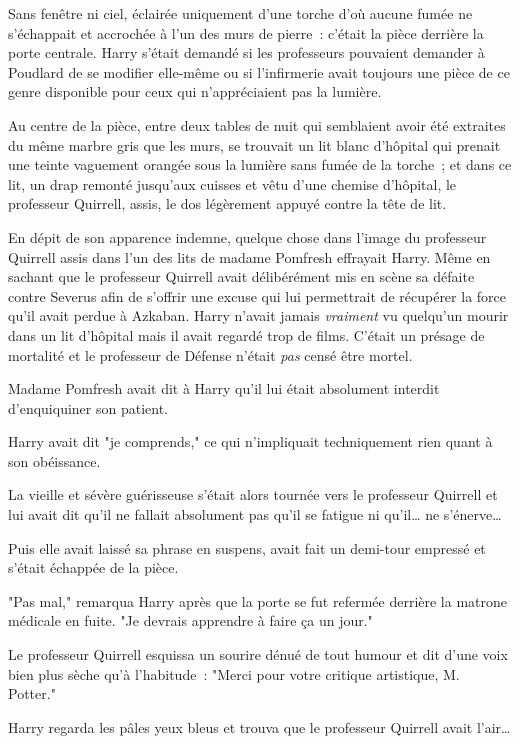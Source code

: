 Sans fenêtre ni ciel, éclairée uniquement d'une torche d'où aucune fumée ne s'échappait et accrochée à l'un des murs de pierre~: c'était la pièce derrière la porte centrale. Harry s'était demandé si les professeurs pouvaient demander à Poudlard de se modifier elle-même ou si l'infirmerie avait toujours une pièce de ce genre disponible pour ceux qui n'appréciaient pas la lumière.

Au centre de la pièce, entre deux tables de nuit qui semblaient avoir été extraites du même marbre gris que les murs, se trouvait un lit blanc d'hôpital qui prenait une teinte vaguement orangée sous la lumière sans fumée de la torche~; et dans ce lit, un drap remonté jusqu'aux cuisses et vêtu d'une chemise d'hôpital, le professeur Quirrell, assis, le dos légèrement appuyé contre la tête de lit.

En dépit de son apparence indemne, quelque chose dans l'image du professeur Quirrell assis dans l'un des lits de madame Pomfresh effrayait Harry. Même en sachant que le professeur Quirrell avait délibérément mis en scène sa défaite contre Severus afin de s'offrir une excuse qui lui permettrait de récupérer la force qu'il avait perdue à Azkaban. Harry n'avait jamais \emph{vraiment} vu quelqu'un mourir dans un lit d'hôpital mais il avait regardé trop de films. C'était un présage de mortalité et le professeur de Défense n'était \emph{pas} censé être mortel.

Madame Pomfresh avait dit à Harry qu'il lui était absolument interdit d'enquiquiner son patient.

Harry avait dit "je comprends," ce qui n'impliquait techniquement rien quant à son obéissance.

La vieille et sévère guérisseuse s'était alors tournée vers le professeur Quirrell et lui avait dit qu'il ne fallait absolument pas qu'il se fatigue ni qu'il… ne s'énerve…

Puis elle avait laissé sa phrase en suspens, avait fait un demi-tour empressé et s'était échappée de la pièce.

"Pas mal," remarqua Harry après que la porte se fut refermée derrière la matrone médicale en fuite. "Je devrais apprendre à faire ça un jour."

Le professeur Quirrell esquissa un sourire dénué de tout humour et dit d'une voix bien plus sèche qu'à l'habitude~: "Merci pour votre critique artistique, M. Potter."

Harry regarda les pâles yeux bleus et trouva que le professeur Quirrell avait l'air…

